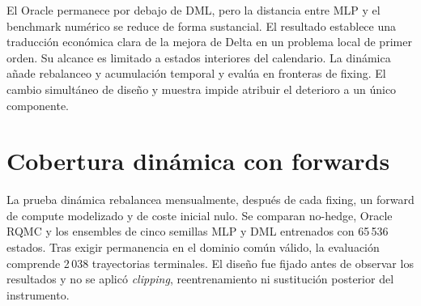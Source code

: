 El Oracle permanece por debajo de DML, pero la distancia entre MLP y el benchmark
numérico se reduce de forma sustancial. El resultado establece una traducción económica
clara de la mejora de Delta en un problema local de primer orden. Su alcance es
limitado a estados interiores del calendario. La dinámica añade rebalanceo y
acumulación temporal y evalúa en fronteras de fixing. El cambio simultáneo de diseño
y muestra impide atribuir el deterioro a un único componente.

\section{Cobertura dinámica con forwards}
\label{sec:dynamic_hedging}

La prueba dinámica rebalancea mensualmente, después de cada fixing, un forward de compute
modelizado y de coste inicial nulo. Se comparan no-hedge, Oracle RQMC y los ensembles de
cinco semillas MLP y DML entrenados con 65\,536 estados. Tras exigir permanencia en el
dominio común válido, la evaluación comprende 2\,038 trayectorias terminales. El diseño fue
fijado antes de observar los resultados y no se aplicó \textit{clipping}, reentrenamiento ni
sustitución posterior del instrumento.

\begin{table}[htbp]
\centering
\small
\caption{Distribución del error terminal en la cobertura dinámica}
\label{tab:dynamic_forward_distribution}
\end{table}

